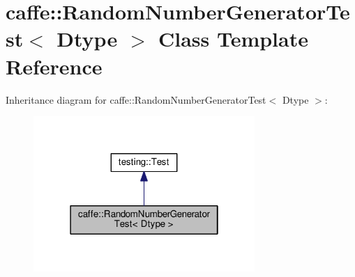 \hypertarget{classcaffe_1_1_random_number_generator_test}{}\section{caffe\+:\+:Random\+Number\+Generator\+Test$<$ Dtype $>$ Class Template Reference}
\label{classcaffe_1_1_random_number_generator_test}


Inheritance diagram for caffe\+:\+:Random\+Number\+Generator\+Test$<$ Dtype $>$\+:
\nopagebreak
\begin{figure}[H]
\begin{center}
\leavevmode
\includegraphics[width=238pt]{classcaffe_1_1_random_number_generator_test__inherit__graph}
\end{center}
\end{figure}
